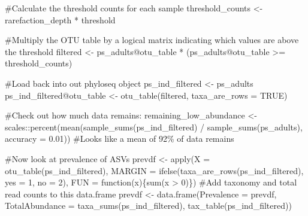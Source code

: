 \documentclass[
  letterpaper,
  DIV=11,
  numbers=noendperiod]{scrartcl}
\newenvironment{Shaded}{\begin{snugshade}}{\end{snugshade}}
\newcommand{\AttributeTok}[1]{\textcolor[rgb]{0.40,0.45,0.13}{#1}}
\newcommand{\CommentTok}[1]{\textcolor[rgb]{0.37,0.37,0.37}{#1}}
\newcommand{\ConstantTok}[1]{\textcolor[rgb]{0.56,0.35,0.01}{#1}}
\newcommand{\ControlFlowTok}[1]{\textcolor[rgb]{0.00,0.23,0.31}{#1}}
\newcommand{\DecValTok}[1]{\textcolor[rgb]{0.68,0.00,0.00}{#1}}
\newcommand{\FloatTok}[1]{\textcolor[rgb]{0.68,0.00,0.00}{#1}}
\newcommand{\FunctionTok}[1]{\textcolor[rgb]{0.28,0.35,0.67}{#1}}
\newcommand{\NormalTok}[1]{\textcolor[rgb]{0.00,0.23,0.31}{#1}}
\newcommand{\OtherTok}[1]{\textcolor[rgb]{0.00,0.23,0.31}{#1}}
\newcommand{\SpecialCharTok}[1]{\textcolor[rgb]{0.37,0.37,0.37}{#1}}
\begin{document}
\begin{Shaded}
\begin{Highlighting}[]
\CommentTok{\#Calculate the threshold counts for each sample}
\NormalTok{threshold\_counts }\OtherTok{\textless{}{-}}\NormalTok{ rarefaction\_depth }\SpecialCharTok{*}\NormalTok{ threshold}

\CommentTok{\#Multiply the OTU table by a logical matrix indicating which values are above the threshold}
\NormalTok{filtered }\OtherTok{\textless{}{-}}\NormalTok{ ps\_adults}\SpecialCharTok{@}\NormalTok{otu\_table }\SpecialCharTok{*}\NormalTok{ (ps\_adults}\SpecialCharTok{@}\NormalTok{otu\_table }\SpecialCharTok{\textgreater{}=}\NormalTok{ threshold\_counts)}

\CommentTok{\#Load back into out phyloseq object}
\NormalTok{ps\_ind\_filtered }\OtherTok{\textless{}{-}}\NormalTok{ ps\_adults}
\NormalTok{ps\_ind\_filtered}\SpecialCharTok{@}\NormalTok{otu\_table }\OtherTok{\textless{}{-}} \FunctionTok{otu\_table}\NormalTok{(filtered, }\AttributeTok{taxa\_are\_rows =} \ConstantTok{TRUE}\NormalTok{)}

\CommentTok{\#Check out how much data remains:}
\NormalTok{remaining\_low\_abundance }\OtherTok{\textless{}{-}}\NormalTok{ scales}\SpecialCharTok{::}\FunctionTok{percent}\NormalTok{(}\FunctionTok{mean}\NormalTok{(}\FunctionTok{sample\_sums}\NormalTok{(ps\_ind\_filtered) }\SpecialCharTok{/} \FunctionTok{sample\_sums}\NormalTok{(ps\_adults), }\AttributeTok{accuracy =} \FloatTok{0.01}\NormalTok{))}
\CommentTok{\#Looks like a mean of 92\% of data remains}

\CommentTok{\#Now look at prevalence of ASVs}
\NormalTok{prevdf }\OtherTok{\textless{}{-}} \FunctionTok{apply}\NormalTok{(}\AttributeTok{X =} \FunctionTok{otu\_table}\NormalTok{(ps\_ind\_filtered),}
             \AttributeTok{MARGIN =} \FunctionTok{ifelse}\NormalTok{(}\FunctionTok{taxa\_are\_rows}\NormalTok{(ps\_ind\_filtered), }
                             \AttributeTok{yes =} \DecValTok{1}\NormalTok{, }\AttributeTok{no =} \DecValTok{2}\NormalTok{),}
             \AttributeTok{FUN =} \ControlFlowTok{function}\NormalTok{(x)\{}\FunctionTok{sum}\NormalTok{(x }\SpecialCharTok{\textgreater{}} \DecValTok{0}\NormalTok{)\})}
\CommentTok{\#Add taxonomy and total read counts to this data.frame}
\NormalTok{prevdf }\OtherTok{\textless{}{-}} \FunctionTok{data.frame}\NormalTok{(}\AttributeTok{Prevalence =}\NormalTok{ prevdf,}
                   \AttributeTok{TotalAbundance =} \FunctionTok{taxa\_sums}\NormalTok{(ps\_ind\_filtered),}
                   \FunctionTok{tax\_table}\NormalTok{(ps\_ind\_filtered))}


\end{Highlighting}
\end{Shaded}
\end{document}

